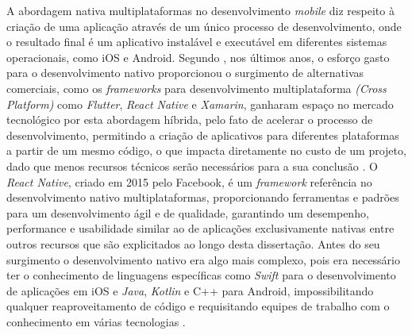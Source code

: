     A abordagem nativa multiplataformas no desenvolvimento \textit{mobile} diz respeito à criação de uma aplicação através de um único processo de desenvolvimento, onde o resultado final é um aplicativo instalável e executável em diferentes sistemas operacionais, como iOS e Android. Segundo \protect\cite{SantosMontan2012}, nos últimos anos, o esforço gasto para o desenvolvimento nativo proporcionou o surgimento de alternativas comerciais, como os \textit{frameworks} para desenvolvimento multiplataforma \textit{(Cross Platform)} como \textit{Flutter}, \textit{React Native} e \textit{Xamarin}, ganharam espaço no mercado tecnológico por esta abordagem híbrida, pelo fato de acelerar o processo de desenvolvimento, permitindo a criação de aplicativos para diferentes plataformas a partir de um mesmo código, o que impacta diretamente no custo de um projeto, dado que menos recursos técnicos serão necessários para a sua conclusão \cite{Barguil2019}. O \textit{React Native}, criado em 2015 pelo Facebook, é um \textit{framework} referência no desenvolvimento nativo multiplataformas, proporcionando ferramentas e padrões para um desenvolvimento ágil e de qualidade, garantindo um desempenho, performance e usabilidade similar ao de aplicações exclusivamente nativas entre outros recursos que são explicitados ao longo desta dissertação. Antes do seu surgimento o desenvolvimento nativo era algo mais complexo, pois era necessário ter o conhecimento de linguagens específicas como \textit{Swift} para o desenvolvimento de aplicações em iOS e \textit{Java}, \textit{Kotlin} e C++ para Android, impossibilitando qualquer reaproveitamento de código e requisitando equipes de trabalho com o conhecimento em várias tecnologias \cite{Charland2011}.
  
